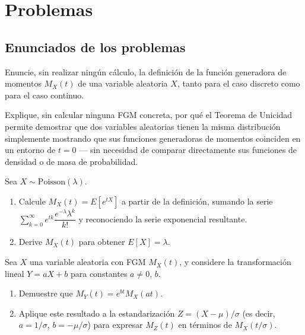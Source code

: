 \section*{Problemas}

\subsection*{Enunciados de los problemas}

\begin{problema}
	\label{prob:5a5f63a}
	Enuncie, sin realizar ningún cálculo, la definición de la función generadora de momentos $M_X(t)$ de una variable aleatoria $X$, tanto para el caso discreto como para el caso continuo.
\end{problema}

\begin{problema}
	\label{prob:f26d9b0}
	Explique, sin calcular ninguna FGM concreta, por qué el Teorema de Unicidad permite demostrar que dos variables aleatorias tienen la misma distribución simplemente mostrando que sus funciones generadoras de momentos coinciden en un entorno de $t=0$ — sin necesidad de comparar directamente sus funciones de densidad o de masa de probabilidad.
\end{problema}

\begin{problema}
	\label{prob:2c4cd93}
	Sea $X \sim \text{Poisson}(\lambda)$.
	\begin{enumerate}
		\item Calcule $M_X(t) = E[e^{tX}]$ a partir de la definición, sumando la serie $\sum_{k=0}^{\infty} e^{tk}\dfrac{e^{-\lambda}\lambda^k}{k!}$ y reconociendo la serie exponencial resultante.
		\item Derive $M_X(t)$ para obtener $E[X]=\lambda$.
	\end{enumerate}
\end{problema}

\begin{problema}
	\label{prob:cf5e60c}
	Sea $X$ una variable aleatoria con FGM $M_X(t)$, y considere la transformación lineal $Y = aX+b$ para constantes $a\neq0$, $b$.
	\begin{enumerate}
		\item Demuestre que $M_Y(t) = e^{bt} M_X(at)$.
		\item Aplique este resultado a la estandarización $Z=(X-\mu)/\sigma$ (es decir, $a=1/\sigma$, $b=-\mu/\sigma$) para expresar $M_Z(t)$ en términos de $M_X(t/\sigma)$.
	\end{enumerate}
\end{problema}

